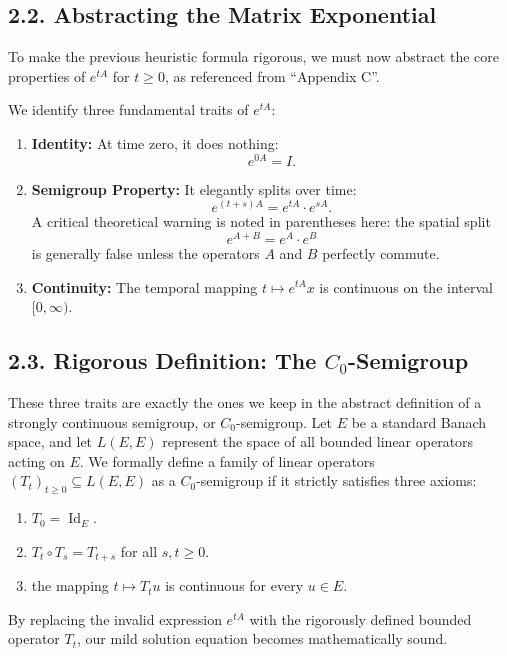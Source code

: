 \documentclass[11pt]{article}
\theoremstyle{definition}
\theoremstyle{remark}
\DeclareMathOperator{\Id}{Id}
\begin{document}
\subsection*{2.2. Abstracting the Matrix Exponential}
To make the previous heuristic formula rigorous, we must now abstract the core properties of \(e^{tA}\) for \(t\ge 0\), as referenced from ``Appendix C''.

We identify three fundamental traits of \(e^{tA}\):
\begin{enumerate}
\item \textbf{Identity:} At time zero, it does nothing:
\[
e^{0A}=I.
\]
\item \textbf{Semigroup Property:} It elegantly splits over time:
\[
e^{(t+s)A}=e^{tA}\cdot e^{sA}.
\]
A critical theoretical warning is noted in parentheses here: the spatial split
\[
e^{A+B}=e^A\cdot e^B
\]
is generally false unless the operators \(A\) and \(B\) perfectly commute.
\item \textbf{Continuity:} The temporal mapping \(t\mapsto e^{tA}x\) is continuous on the interval \([0,\infty)\).
\end{enumerate}

\subsection*{2.3. Rigorous Definition: The \(C_0\)-Semigroup}
These three traits are exactly the ones we keep in the abstract definition of a strongly continuous semigroup, or \(C_0\)-semigroup. Let \(E\) be a standard Banach space, and let \(L(E,E)\) represent the space of all bounded linear operators acting on \(E\). We formally define a family of linear operators \((T_t)_{t\ge 0}\subseteq L(E,E)\) as a \(C_0\)-semigroup if it strictly satisfies three axioms:
\begin{enumerate}
\item \(T_0=\Id_E\).
\item \(T_t\circ T_s=T_{t+s}\) for all \(s,t\ge 0\).
\item the mapping \(t\mapsto T_tu\) is continuous for every \(u\in E\).
\end{enumerate}
By replacing the invalid expression \(e^{tA}\) with the rigorously defined bounded operator \(T_t\), our mild solution equation becomes mathematically sound.
\end{document}
